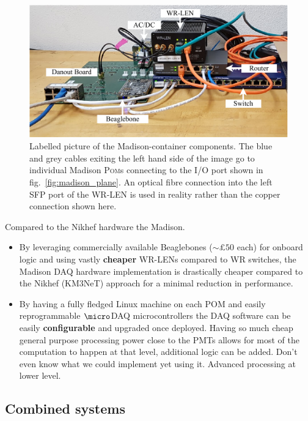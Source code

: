 \begin{figure} %
    \includegraphics[width=\textwidth]{diagrams/5-daq/madison_box.pdf}
    \caption[Labelled picture of the Madison-container components.]
    {Labelled picture of the Madison-container components. The blue and grey cables exiting the
        left hand side of the image go to individual Madison \textsc{Pom}s connecting to the I/O
        port shown in fig.~\ref{fig:madison_plane}. An optical fibre connection into the left SFP
        port of the WR-LEN is used in reality rather than the copper connection shown here.}
    \label{fig:madison_box}
\end{figure}

Compared to the Nikhef hardware the Madison.
\begin{itemize}
    \item By leveraging commercially available Beaglebones ($\sim£50$ each) for onboard logic and
    using vastly \textbf{cheaper} WR-LENs compared to WR switches, the Madison DAQ hardware
    implementation is drastically cheaper compared to the Nikhef (KM3NeT) approach for a minimal
    reduction in performance.
    \item By having a fully fledged Linux machine on each POM and easily reprogrammable
    $\micro$DAQ microcontrollers the DAQ software can be easily \textbf{configurable} and upgraded
    once deployed. Having so much cheap general purpose processing power close to the PMTs allows
    for most of the computation to happen at that level, additional logic can be added. Don't even
    know what we could implement yet using it. Advanced processing at lower level. 
\end{itemize}

\subsection{Combined systems} %
\label{sec:daq_hard_combined} %

